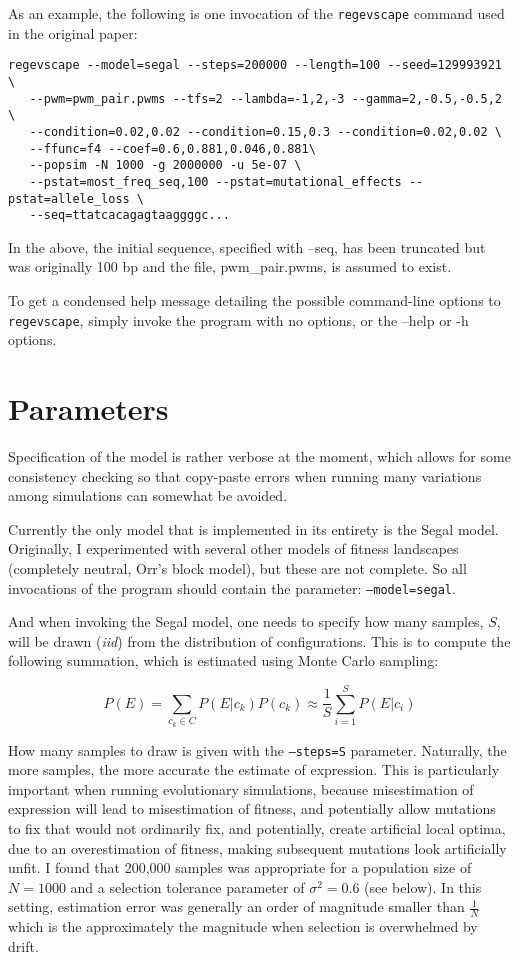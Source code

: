 \documentclass[11pt]{article}
\begin{document}
As an example, the following is one invocation of the \texttt{regevscape} command used in the original paper:

\begin{verbatim}
regevscape --model=segal --steps=200000 --length=100 --seed=129993921 \
   --pwm=pwm_pair.pwms --tfs=2 --lambda=-1,2,-3 --gamma=2,-0.5,-0.5,2 \
   --condition=0.02,0.02 --condition=0.15,0.3 --condition=0.02,0.02 \
   --ffunc=f4 --coef=0.6,0.881,0.046,0.881\
   --popsim -N 1000 -g 2000000 -u 5e-07 \
   --pstat=most_freq_seq,100 --pstat=mutational_effects --pstat=allele_loss \
   --seq=ttatcacagagtaaggggc...
\end{verbatim}

\noindent In the above, the initial sequence, specified with --seq, has been truncated but was originally 100 bp and the file, pwm\_pair.pwms, is assumed to exist. 

To get a condensed help message detailing the possible command-line options to \texttt{regevscape}, simply invoke the program with no options, or the --help or -h options.

\section*{Parameters}

Specification of the model is rather verbose at the moment, which allows for some consistency checking so that copy-paste errors when running many variations among simulations can somewhat be avoided. 

Currently the only model that is implemented in its entirety is the Segal model. Originally, I experimented with several other models of fitness landscapes (completely neutral, Orr's block model), but these are not complete. So all invocations of the program should contain the parameter: \texttt{--model=segal}.

And when invoking the Segal model, one needs to specify how many samples, $S$, will be drawn (\emph{iid}) from the distribution of configurations. This is to compute the following summation, which is estimated using Monte Carlo sampling: 

\begin{displaymath}
P(E) = \sum_{c_k \in C}P(E|c_k)P(c_k) \approx \frac{1}{S}\sum_{i=1}^{S}P(E|c_i) 
\end{displaymath}

\noindent How many samples to draw is given with the \texttt{--steps=S} parameter. Naturally, the more samples, the more accurate the estimate of expression. This is particularly important when running evolutionary simulations, because misestimation of expression will lead to misestimation of fitness, and potentially allow mutations to fix that would not ordinarily fix, and potentially, create artificial local optima, due to an overestimation of fitness, making subsequent mutations look artificially unfit. I found that 200,000 samples was appropriate for a population size of $N=1000$ and a selection tolerance parameter of $\sigma^2 = 0.6$ (see below). In this setting, estimation error was generally an order of magnitude smaller than $\frac{1}{N}$ which is the approximately the magnitude when selection is overwhelmed by drift.
\end{document}
